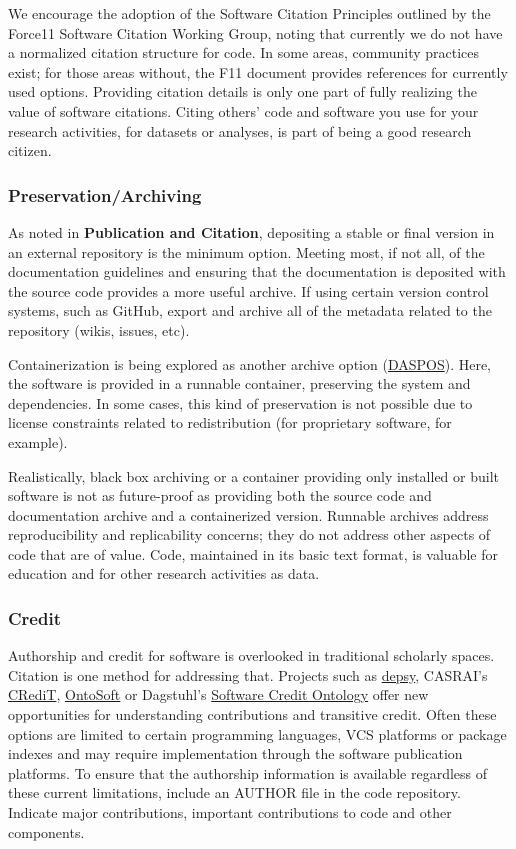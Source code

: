 \documentclass{article}
\begin{document}
We encourage the adoption of the Software Citation Principles \autocite{smith_software_2016} outlined by the Force11 Software Citation Working Group, noting that currently we do not have a normalized citation structure for code. In some areas, community practices exist; for those areas without, the F11 document provides references for currently used options. Providing citation details is only one part of fully realizing the value of software citations. Citing others’ code and software you use for your research activities, for datasets or analyses, is part of being a good research citizen.

\subsubsection{Preservation/Archiving}
As noted in \textbf{Publication and Citation}, depositing a stable or final version in an external repository is the minimum option. Meeting most, if not all, of the documentation guidelines and ensuring that the documentation is deposited with the source code provides a more useful archive. If using certain version control systems, such as GitHub, export and archive all of the metadata related to the repository (wikis, issues, etc). 
 
Containerization is being explored as another archive option (\href{https://daspos.crc.nd.edu/} {DASPOS}). Here, the software is provided in a runnable container, preserving the system and dependencies. In some cases, this kind of preservation is not possible due to license constraints related to redistribution (for proprietary software, for example).
 
Realistically, black box archiving or a container providing only installed or built software is not as future-proof as providing both the source code and documentation archive and a containerized version. Runnable archives address reproducibility and replicability concerns; they do not address other aspects of code that are of value. Code, maintained in its basic text format, is valuable for education and for other research activities as data. 

\subsubsection{Credit}
Authorship and credit for software is overlooked in traditional scholarly spaces. Citation is one method for addressing that. Projects such as \href{http://depsy.org/} {depsy}, CASRAI’s \href{http://casrai.org/credit} {CRediT}, \href{http://ontosoft.org/ontology/software/} {OntoSoft} or Dagstuhl’s \href{https://dagstuhleas.github.io/SoftwareCreditRoles/doc/index-en.html} {Software Credit Ontology} offer new opportunities for understanding contributions and transitive credit. Often these options are limited to certain programming languages, VCS platforms or package indexes and may require implementation through the software publication platforms. To ensure that the authorship information is available regardless of these current limitations, include an AUTHOR file in the code repository. Indicate major contributions, important contributions to code and other components. 
\end{document}
